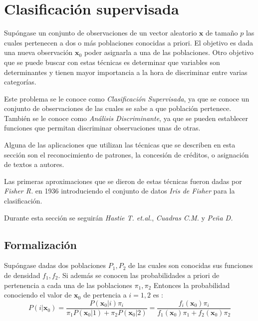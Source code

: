 \newpage
\section{Clasificación supervisada}

\noindent Supóngase un conjunto de observaciones de un vector aleatorio $\textbf{x}$ de tamaño $p$ las cuales pertenecen a dos o más poblaciones conocidas a priori. El objetivo es dada una nueva observación $\textbf{x}_0$ poder asignarla a una de las poblaciones. Otro objetivo que se puede buscar con estas técnicas es determinar que variables son determinantes y tienen mayor importancia a la hora de discriminar entre varias categorías. 

\noindent Este problema se le conoce como \emph{Clasificación Supervisada}, ya que  se conoce un conjunto de observaciones de las cuales se sabe a que población pertenece. También se le conoce como \emph{Análisis Discriminante}, ya que se pueden establecer funciones que permitan discriminar observaciones unas de otras. 

\noindent Alguna de las aplicaciones que utilizan las técnicas que se describen en esta sección son el reconocimiento de patrones, la concesión de créditos, o asignación de textos a autores. 

\noindent Las primeras aproximaciones que se dieron de estas técnicas fueron dadas por \emph{Fisher R.} en 1936 introduciendo el conjunto de datos  \emph{Iris de Fisher} para la clasificación. 

\noindent Durante esta sección se seguirán \emph{Hastie T. et.al.}\cite{Hastie 2001}, \emph{Cuadras C.M.}\cite{Cuadras 2014} y \emph{Peña D.} \cite{Peña 2002}

\subsection{Formalización}

\noindent Supóngase dadas dos poblaciones $P_1,P_2 $ de las cuales son conocidas sus funciones de densidad $f_1, f_2 $. Si además se conocen las probabilidades a priori de pertenencia a cada una de las poblaciones $\pi_1,\pi_2$ Entonces la probabilidad conociendo el valor de $\textbf{x}_0$ de pertencia a $i=1,2$ es :
\begin{equation}
P(i|\textbf{x}_0)=\dfrac{P(\textbf{x}_0|i)\pi_i}{\pi_1P(\textbf{x}_0|1)+\pi_2P(\textbf{x}_0|2)}=\dfrac{f_i(\textbf{x}_0)\pi_i}{f_1(\textbf{x}_0)\pi_1+f_2(\textbf{x}_0)\pi_2}
\end{equation}

